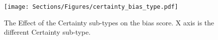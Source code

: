 \begin{figure}[t!]
\centering
\texttt{[image: Sections/Figures/certainty\_bias\_type.pdf]}
\caption{The Effect of the Certainty sub-types on the bias score. X axis is the different Certainty sub-type.}
\label{fig:certainty_bias_type}
\end{figure}
